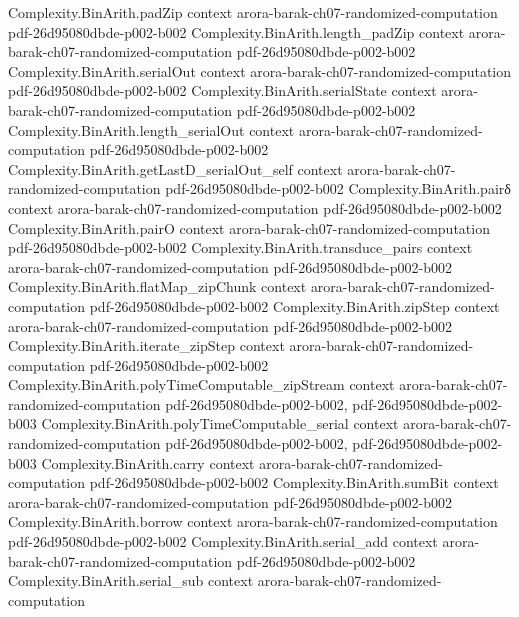 \begin{theorem}
\proofstep
  {Complexity.BinArith.padZip}
  {context}
  {arora-barak-ch07-randomized-computation}
  {pdf-26d95080dbde-p002-b002}
\proofstep
  {Complexity.BinArith.length_padZip}
  {context}
  {arora-barak-ch07-randomized-computation}
  {pdf-26d95080dbde-p002-b002}
\proofstep
  {Complexity.BinArith.serialOut}
  {context}
  {arora-barak-ch07-randomized-computation}
  {pdf-26d95080dbde-p002-b002}
\proofstep
  {Complexity.BinArith.serialState}
  {context}
  {arora-barak-ch07-randomized-computation}
  {pdf-26d95080dbde-p002-b002}
\proofstep
  {Complexity.BinArith.length_serialOut}
  {context}
  {arora-barak-ch07-randomized-computation}
  {pdf-26d95080dbde-p002-b002}
\proofstep
  {Complexity.BinArith.getLastD_serialOut_self}
  {context}
  {arora-barak-ch07-randomized-computation}
  {pdf-26d95080dbde-p002-b002}
\proofstep
  {Complexity.BinArith.pairδ}
  {context}
  {arora-barak-ch07-randomized-computation}
  {pdf-26d95080dbde-p002-b002}
\proofstep
  {Complexity.BinArith.pairO}
  {context}
  {arora-barak-ch07-randomized-computation}
  {pdf-26d95080dbde-p002-b002}
\proofstep
  {Complexity.BinArith.transduce_pairs}
  {context}
  {arora-barak-ch07-randomized-computation}
  {pdf-26d95080dbde-p002-b002}
\proofstep
  {Complexity.BinArith.flatMap_zipChunk}
  {context}
  {arora-barak-ch07-randomized-computation}
  {pdf-26d95080dbde-p002-b002}
\proofstep
  {Complexity.BinArith.zipStep}
  {context}
  {arora-barak-ch07-randomized-computation}
  {pdf-26d95080dbde-p002-b002}
\proofstep
  {Complexity.BinArith.iterate_zipStep}
  {context}
  {arora-barak-ch07-randomized-computation}
  {pdf-26d95080dbde-p002-b002}
\proofstep
  {Complexity.BinArith.polyTimeComputable_zipStream}
  {context}
  {arora-barak-ch07-randomized-computation}
  {pdf-26d95080dbde-p002-b002,
    pdf-26d95080dbde-p002-b003}
\proofstep
  {Complexity.BinArith.polyTimeComputable_serial}
  {context}
  {arora-barak-ch07-randomized-computation}
  {pdf-26d95080dbde-p002-b002,
    pdf-26d95080dbde-p002-b003}
\proofstep
  {Complexity.BinArith.carry}
  {context}
  {arora-barak-ch07-randomized-computation}
  {pdf-26d95080dbde-p002-b002}
\proofstep
  {Complexity.BinArith.sumBit}
  {context}
  {arora-barak-ch07-randomized-computation}
  {pdf-26d95080dbde-p002-b002}
\proofstep
  {Complexity.BinArith.borrow}
  {context}
  {arora-barak-ch07-randomized-computation}
  {pdf-26d95080dbde-p002-b002}
\proofstep
  {Complexity.BinArith.serial_add}
  {context}
  {arora-barak-ch07-randomized-computation}
  {pdf-26d95080dbde-p002-b002}
\proofstep
  {Complexity.BinArith.serial_sub}
  {context}
  {arora-barak-ch07-randomized-computation}

\end{theorem}
